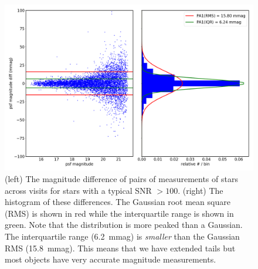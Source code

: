 \documentclass[twocolumn]{aastex62}
\begin{document}
\begin{figure}
\centering
\includegraphics[width=0.9\columnwidth]{DC1-imsim-dithered_r_PA1.png}
\caption{(left) The magnitude difference of pairs of measurements of stars across visits for stars with a typical SNR $>100$.  (right) The histogram of these differences.  The Gaussian root mean square (RMS) is shown in red while the interquartile range is shown in green. Note that the distribution is more peaked than a Gaussian. The interquartile range (6.2~mmag) is {\em smaller} than the Gaussian RMS (15.8~mmag). This means that we have extended tails but most objects have very accurate magnitude measurements.}
\label{fig:validate_drp_PA1}
\end{figure}
\end{document}
